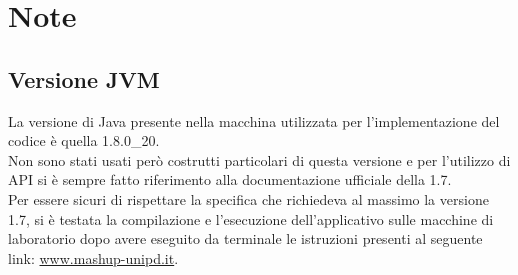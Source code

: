 % 
%
% 
%

\section{Note}
	\subsection{Versione JVM}
La versione di Java presente nella macchina utilizzata per l'implementazione del codice è quella 1.8.0\_20. \\
Non sono stati usati però costrutti particolari di questa versione e per l'utilizzo di API si è sempre fatto riferimento alla documentazione ufficiale della 1.7. \\
Per essere sicuri di rispettare la specifica che richiedeva al massimo la versione 1.7, si è testata la compilazione e l'esecuzione dell'applicativo sulle macchine di laboratorio dopo avere eseguito da terminale le istruzioni presenti al seguente link: \href{www.mashup-unipd.it}{www.mashup-unipd.it}.
